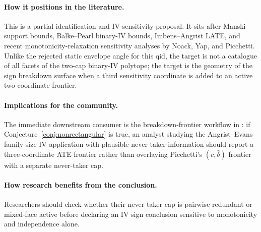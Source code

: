 \documentclass[11pt]{article}
\theoremstyle{definition}
\theoremstyle{plain}
\theoremstyle{remark}
\begin{document}
\paragraph{How it positions in the literature.}
This is a partial-identification and IV-sensitivity proposal.  It sits after
Manski support bounds, Balke--Pearl binary-IV bounds, Imbens--Angrist LATE, and
recent monotonicity-relaxation sensitivity analyses by Noack, Yap, and
Picchetti.  Unlike the rejected static envelope angle for this qid, the target
is not a catalogue of all facets of the two-cap binary-IV polytope; the target
is the geometry of the sign breakdown surface when a third sensitivity
coordinate is added to an active two-coordinate frontier.

\paragraph{Implications for the community.}
The immediate downstream consumer is the breakdown-frontier workflow in
\citet{Picchetti2026}: if Conjecture~\ref{conj:nonrectangular} is true, an
analyst studying the Angrist--Evans family-size IV application with plausible
never-taker information should report a three-coordinate ATE frontier rather
than overlaying Picchetti's \((c,\bar\delta)\) frontier with a separate
never-taker cap.

\paragraph{How research benefits from the conclusion.}
Researchers should check whether their never-taker cap is pairwise redundant or
mixed-face active before declaring an IV sign conclusion sensitive to
monotonicity and independence alone.
\end{document}
